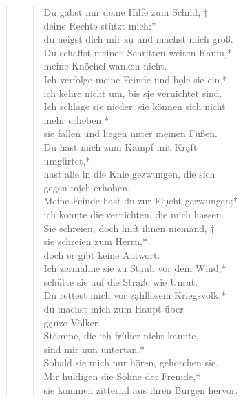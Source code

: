 \begin{quote}
\begin{verse}

\vin Du gabst mir deine Hilfe zum Schild, † \\ \vin deine R\d echte stützt mich;*\\ \vin
du neigst dich mir z\d u und machst mich groß.\\

Du schaffst meinen Schr\d itten weiten Raum,*\\
meine Kn\d öchel wanken nicht.\\ \vin
Ich verfolge meine Feinde und h\d ole sie ein,*\\ \vin
ich kehre nicht um, bis s\d ie vernichtet sind.\\
Ich schlage sie nieder; sie können sich n\d icht\\  mehr erheben,*\\
sie fallen und liegen unter m\d einen Füßen.\\ \vin
Du hast mich zum Kampf mit Kr\d aft\\ \vin  umgürtet,*\\ \vin
hast alle in die Knie gezwungen, die sich \\ \vin gegen m\d ich erhoben.\\
Meine Feinde hast du zur Fl\d ucht gezwungen;*\\
ich konnte die vernichten, d\d ie mich hassen.\\ \vin
Sie schreien, doch hilft ihnen niemand, †\\ \vin  sie schr\d eien zum Herrn,*\\ \vin
doch er gibt k\d eine Antwort.\\
Ich zermalme sie zu St\d aub vor dem Wind,*\\
schütte sie auf die Str\d aße wie Unrat.\\ \vin
Du rettest mich vor z\d ahllosem Kriegsvolk,*\\ \vin
du machst mich zum Haupt über\\ \vin  g\d anze Völker.\\
Stämme, die ich früher nicht kannte,\\ sind m\d ir nun untertan.*\\
Sobald sie mich nur h\d ören, gehorchen sie.\\ \vin
Mir huldigen die S\d öhne der Fremde,*\\ \vin
sie kommen zitternd aus ihren B\d urgen hervor.\\
\end{verse}





\end{quote}